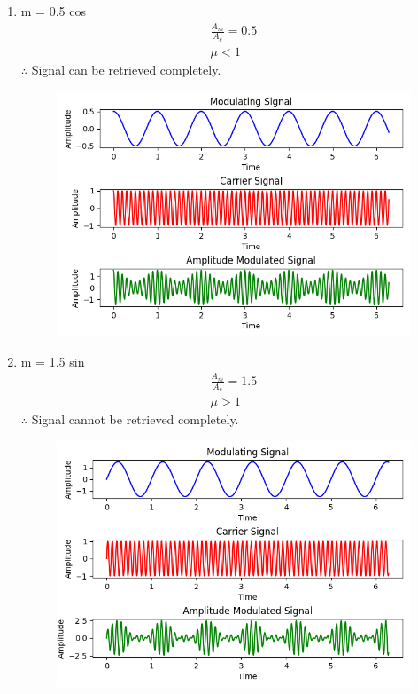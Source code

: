 \documentclass[journal,12pt,twocolumn]{IEEEtran}
\theoremstyle{remark}
\begin{document}
\begin{enumerate}

    \item m = 0.5 cos 
\begin{align}
    \frac{A_m}{A_c}= 0.5 \\
    \mu <1
\end{align}
$\therefore$ Signal can be retrieved completely.
\renewcommand{\thefigure}{\theenumi}
 \renewcommand{\thetable}{\theenumi}
\begin{figure}[h]
  
  \includegraphics[width=\columnwidth]{figs/Figure_1.png}
  
\end{figure}
\item m = 1.5 sin 
\begin{align}
    \frac{A_m}{A_c}= 1.5\\
    \mu >1
\end{align}
$\therefore$ Signal cannot be retrieved completely.
\renewcommand{\thefigure}{\theenumi}
 \renewcommand{\thetable}{\theenumi}
\begin{figure}[h]
  
  \includegraphics[width=\columnwidth]{figs/Figure_2.png}
  

\end{figure}
\end{enumerate}
\end{document}
